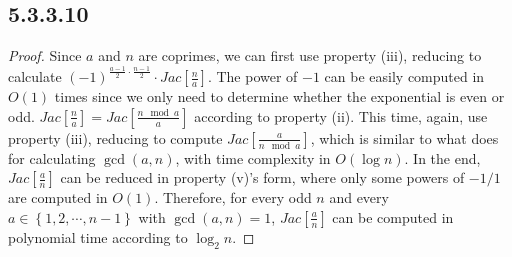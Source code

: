\documentclass[twocolumn]{article}
\begin{document}
	\subsection*{5.3.3.10}
	\begin{proof}
		Since $a$ and $n$ are coprimes, we can first use property (iii), reducing to calculate $(-1)^{\frac{a-1}{2}\cdot\frac{n-1}{2}}\cdot Jac\left[\frac{n}{a}\right]$. The power of $-1$ can be easily computed in $O(1)$ times since we only need to determine whether the exponential is even or odd. $Jac\left[\frac{n}{a}\right]=Jac\left[\frac{n\mod a}{a}\right]$ according to property (ii). This time, again, use property (iii), reducing to compute $Jac\left[\frac{a}{n\mod a}\right]$, which is similar to what  does for calculating $\gcd(a,n)$, with time complexity in $O(\log n)$. In the end, $Jac\left[\frac{a}{n}\right]$ can be reduced in property (v)'s form, where only some powers of $-1/1$ are computed in $O(1)$. Therefore, for every odd $n$ and every $a\in\left\{1,2,\cdots,n-1\right\}$ with $\gcd(a,n)=1$, $Jac\left[\frac{a}{n}\right]$ can be computed in polynomial time according to $\log_2n$.
	\end{proof}
\end{document}

